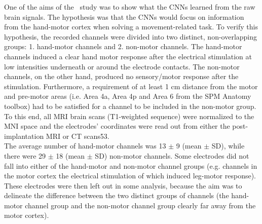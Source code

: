 One of the aims of the~\cite{Hammer-2021} study was to show what the CNNs learned from the raw brain signals.
The hypothesis was that the CNNs would focus on information from the hand-motor cortex when solving a movement-related task.
To verify this hypothesis, the recorded channels were divided into two distinct, non-overlapping groups: 1. hand-motor channels and 2. non-motor channels.
The hand-motor channels induced a clear hand motor response after the electrical stimulation at low intensities underneath or around the electrode contacts.
The non-motor channels, on the other hand, produced no sensory/motor response after the stimulation.
Furthermore, a requirement of at least 1 cm distance from the motor and pre-motor areas (i.e. Area 4a, Area 4p and Area 6 from the SPM Anatomy toolbox\cite{eickhoff-new-2005}) had to be satisfied for a channel to be included in the non-motor group.
To this end, all MRI brain scans (T1-weighted sequence) were normalized to the MNI space and the electrodes' coordinates were read out from either the post-implantation MRI or CT scans53. \\

The average number of hand-motor channels was 13 $\pm$ 9 (mean $\pm$ SD), while there were 29 $\pm$ 18 (mean $\pm$ SD) non-motor channels.
Some electrodes did not fall into either of the hand-motor and non-motor channel groups (e.g. channels in the motor cortex the electrical stimulation of which induced leg-motor response).
These electrodes were then left out in some analysis, because the aim was to delineate the difference between the two distinct groups of channels (the hand-motor channel group and the non-motor channel group clearly far away from the motor cortex).



